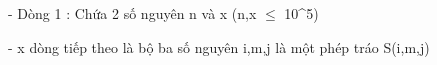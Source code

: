 - Dòng 1 : Chứa 2 số nguyên n và x (n,x  $\le$  10^5)  

   - x dòng tiếp theo là bộ ba số nguyên i,m,j là một phép tráo S(i,m,j)  

\